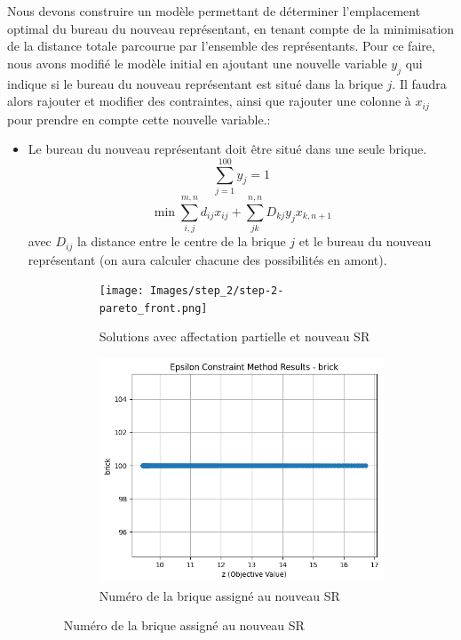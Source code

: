 Nous devons construire un modèle permettant de déterminer l'emplacement optimal du bureau du nouveau représentant, en tenant compte de la minimisation de la distance totale parcourue par l'ensemble des représentants.
Pour ce faire, nous avons modifié le modèle initial en ajoutant une nouvelle variable $y_{j}$ qui indique si le bureau du nouveau représentant est situé dans la brique $j$.
Il faudra alors rajouter et modifier des contraintes, ainsi que rajouter une colonne à $x_{ij}$ pour prendre en compte cette nouvelle variable.: 
\begin{itemize}
    \item Le bureau du nouveau représentant doit être situé dans une seule brique.
    \begin{equation}
        \sum_{j=1}^{100} y_j = 1
    \end{equation}
    \begin{equation}
        \min \sum_{i,j}^{m, n} d_{ij} x_{ij} + \sum_{jk}^{n, n} D_{kj} y_{j} x_{k, n + 1} 
    \end{equation}
    avec $D_{ij}$ la distance entre le centre de la brique $j$ et le bureau du nouveau représentant (on aura calculer chacune des possibilités en amont).

    \begin{figure}[H]
        \centering
        \begin{subfigure}[b]{0.48\textwidth}
            \centering
            \texttt{[image: Images/step\_2/step-2-pareto\_front.png]}
            \caption{Solutions avec affectation partielle et nouveau SR}
        \end{subfigure}
        \hfill
        \begin{subfigure}[b]{0.48\textwidth}
            \centering
            \includegraphics[width=\textwidth]{Images/step_2/step_2-pareto_front2.png}
            \caption{Numéro de la brique assigné au nouveau SR}
        \end{subfigure}
        

\end{figure}
\end{itemize}
